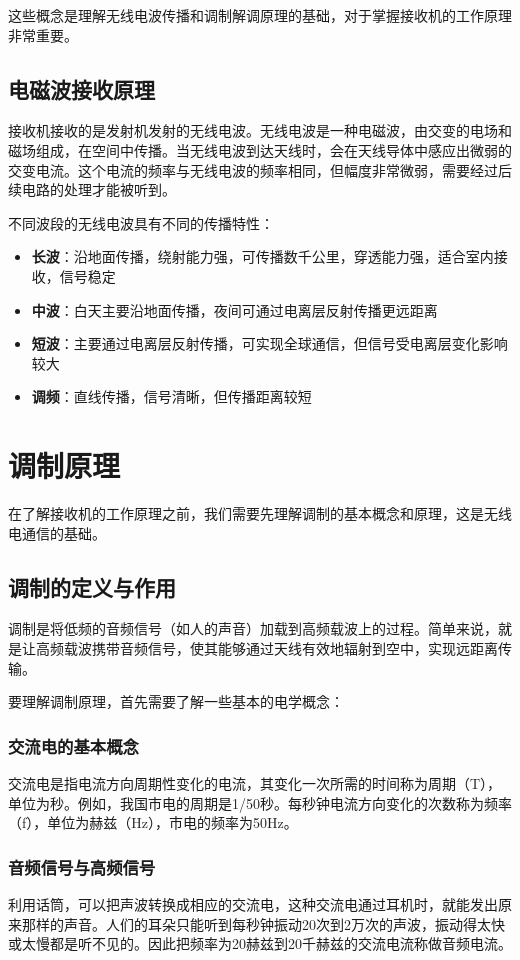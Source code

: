 \documentclass[12pt,UTF8]{ctexbook}
\begin{document}
这些概念是理解无线电波传播和调制解调原理的基础，对于掌握接收机的工作原理非常重要。

\subsection{电磁波接收原理}

接收机接收的是发射机发射的无线电波。无线电波是一种电磁波，由交变的电场和磁场组成，在空间中传播。当无线电波到达天线时，会在天线导体中感应出微弱的交变电流。这个电流的频率与无线电波的频率相同，但幅度非常微弱，需要经过后续电路的处理才能被听到。

不同波段的无线电波具有不同的传播特性：
\begin{itemize}[leftmargin=3.5em]
    \item \textbf{长波}：沿地面传播，绕射能力强，可传播数千公里，穿透能力强，适合室内接收，信号稳定
    \item \textbf{中波}：白天主要沿地面传播，夜间可通过电离层反射传播更远距离
    \item \textbf{短波}：主要通过电离层反射传播，可实现全球通信，但信号受电离层变化影响较大
    \item \textbf{调频}：直线传播，信号清晰，但传播距离较短
\end{itemize}

\section{调制原理}

在了解接收机的工作原理之前，我们需要先理解调制的基本概念和原理，这是无线电通信的基础。

\subsection{调制的定义与作用}
调制是将低频的音频信号（如人的声音）加载到高频载波上的过程。简单来说，就是让高频载波携带音频信号，使其能够通过天线有效地辐射到空中，实现远距离传输。

要理解调制原理，首先需要了解一些基本的电学概念：

\subsubsection{交流电的基本概念}
交流电是指电流方向周期性变化的电流，其变化一次所需的时间称为周期（T），单位为秒。例如，我国市电的周期是1/50秒。每秒钟电流方向变化的次数称为频率（f），单位为赫兹（Hz），市电的频率为50Hz。

\subsubsection{音频信号与高频信号}
利用话筒，可以把声波转换成相应的交流电，这种交流电通过耳机时，就能发出原来那样的声音。人们的耳朵只能听到每秒钟振动20次到2万次的声波，振动得太快或太慢都是听不见的。因此把频率为20赫兹到20千赫兹的交流电流称做音频电流。
\end{document}
